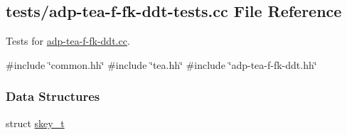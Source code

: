 \hypertarget{adp-tea-f-fk-ddt-tests_8cc}{\subsection{tests/adp-\/tea-\/f-\/fk-\/ddt-\/tests.cc \-File \-Reference}
\label{adp-tea-f-fk-ddt-tests_8cc}
}


\-Tests for \hyperlink{adp-tea-f-fk-ddt_8cc}{adp-\/tea-\/f-\/fk-\/ddt.\-cc}.  


{\ttfamily \#include \char`\"{}common.\-hh\char`\"{}}\*
{\ttfamily \#include \char`\"{}tea.\-hh\char`\"{}}\*
{\ttfamily \#include \char`\"{}adp-\/tea-\/f-\/fk-\/ddt.\-hh\char`\"{}}\*
\subsubsection*{\-Data \-Structures}
\begin{DoxyCompactItemize}
\item 
struct \hyperlink{structskey__t}{skey\-\_\-t}
\end{DoxyCompactItemize}
